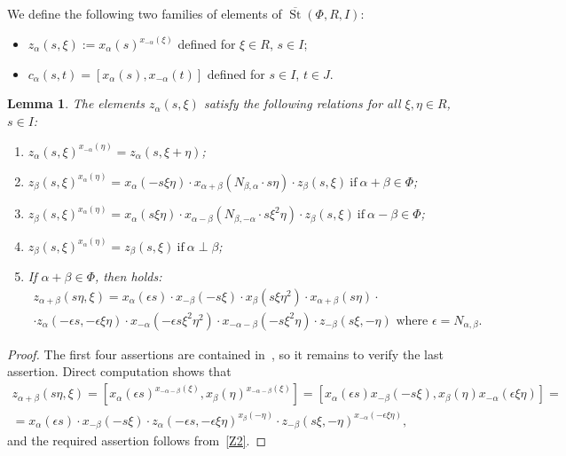 \documentclass[oneside, 8pt]{amsart}
\newtheorem{lemma}{Lemma}
\theoremstyle{remark}
\theoremstyle{definition}
\numberwithin{lemma}{section}
\numberwithin{prop}{section}
\numberwithin{corollary}{section}
\numberwithin{externaltheorem}{section}
\DeclareMathOperator{\St}{St}
\numberwithin{equation}{section}
\begin{document}
We define the following two families of elements of $\overline{\St}(\Phi, R, I)$:
\begin{itemize}
 \item $z_\alpha(s, \xi) := x_\alpha(s)^{x_{-\alpha}(\xi)}$ defined for $\xi \in R$, $s \in I$;
 \item $c_\alpha(s, t) = [x_\alpha(s), x_{-\alpha}(t)]$ defined for $s \in I$, $t \in J$.
\end{itemize}

\begin{lemma}\label{Zrels} The elements $z_\alpha(s, \xi)$ satisfy the following relations for all $\xi, \eta\in R$, $s\in I$:
\begin{enumerate} 
\item\label{Z1} $z_{\alpha}(s, \xi) ^ {x_{-\alpha}(\eta)} = z_{\alpha}(s, \xi + \eta)$;
\item\label{Z2} $z_{\beta}(s, \xi) ^ {x_{\alpha}(\eta)} = x_{\alpha} (- s\xi \eta) \cdot x_{\alpha+\beta} (N_{\beta, \alpha}\cdot s\eta)     \cdot z_{\beta}(s, \xi)\ \text{if}\ \alpha + \beta \in \Phi$;
\item\label{Z3} $z_{\beta}(s, \xi) ^ {x_{\alpha}(\eta)} = x_{\alpha} (s\xi \eta) \cdot x_{\alpha-\beta} (N_{\beta,-\alpha}\cdot s\xi^2\eta) \cdot z_{\beta}(s, \xi)\ \text{if}\ \alpha - \beta \in \Phi$;

\item\label{Z4} $z_{\beta}(s, \xi) ^ {x_{\alpha}(\eta)} = z_{\beta}(s, \xi)\ \text{if}\ \alpha\perp\beta$;
\item If $\alpha+\beta\in\Phi$, then holds:
\begin{multline} \label{Z5} z_{\alpha+\beta}(s\eta, \xi) = x_\alpha(\epsilon s)\cdot x_{-\beta}(-s\xi) \cdot x_{\beta}(s\xi\eta^2) \cdot x_{\alpha+\beta}(s \eta) \cdot \\ \cdot z_\alpha(-\epsilon s, -\epsilon \xi\eta) \cdot
  x_{-\alpha}(-\epsilon s\xi^2\eta^2) \cdot x_{-\alpha-\beta}(- s \xi^2 \eta) \cdot z_{-\beta}(s\xi, -\eta)\text{ where $\epsilon = N_{\alpha,\beta}$.}\end{multline}
\end{enumerate} \end{lemma}
\begin{proof}
The first four assertions are contained in~\cite[Lemma~9]{S15}, so it remains to verify the last assertion.
Direct computation shows that
\begin{multline} \nonumber
  z_{\alpha+\beta}(s\eta, \xi) = [x_\alpha(\epsilon s)^{x_{-\alpha-\beta}(\xi)}, x_\beta(\eta)^{x_{-\alpha-\beta}(\xi)}] =
  [x_\alpha(\epsilon s) x_{-\beta}(-s\xi), x_{\beta}(\eta) x_{-\alpha}(\epsilon \xi\eta)] = \\ 
  = x_\alpha(\epsilon s) \cdot x_{-\beta}(-s\xi) \cdot z_\alpha(-\epsilon s, -\epsilon \xi\eta)^{x_{\beta}(-\eta)} \cdot z_{-\beta}(s\xi, -\eta)^{x_{-\alpha}(-\epsilon \xi\eta)},
\end{multline} 
and the required assertion follows from~\eqref{Z2}.
\end{proof}
\end{document}
